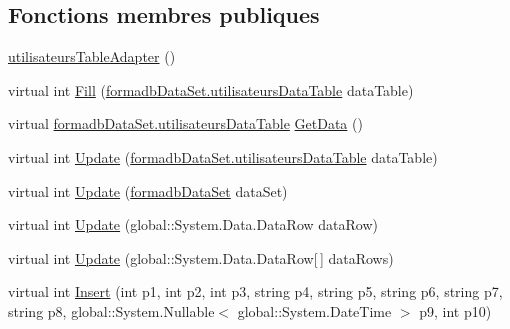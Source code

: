 \subsection*{Fonctions membres publiques}
\begin{DoxyCompactItemize}
\item 
\hyperlink{classforma_1_1formadb_data_set_table_adapters_1_1utilisateurs_table_adapter_aa3e62a7d0672b2e2de3e43ef5962ad52}{utilisateurs\+Table\+Adapter} ()
\item 
virtual int \hyperlink{classforma_1_1formadb_data_set_table_adapters_1_1utilisateurs_table_adapter_a84a57c5fdff4bf02ef608b338e19df12}{Fill} (\hyperlink{classforma_1_1formadb_data_set_1_1utilisateurs_data_table}{formadb\+Data\+Set.\+utilisateurs\+Data\+Table} data\+Table)
\item 
virtual \hyperlink{classforma_1_1formadb_data_set_1_1utilisateurs_data_table}{formadb\+Data\+Set.\+utilisateurs\+Data\+Table} \hyperlink{classforma_1_1formadb_data_set_table_adapters_1_1utilisateurs_table_adapter_acbeeb92369790ff85945b79554afbf77}{Get\+Data} ()
\item 
virtual int \hyperlink{classforma_1_1formadb_data_set_table_adapters_1_1utilisateurs_table_adapter_a3b8268d9c4eba101c27c9716e8c0e408}{Update} (\hyperlink{classforma_1_1formadb_data_set_1_1utilisateurs_data_table}{formadb\+Data\+Set.\+utilisateurs\+Data\+Table} data\+Table)
\item 
virtual int \hyperlink{classforma_1_1formadb_data_set_table_adapters_1_1utilisateurs_table_adapter_a6f61d7aecd388d2dc43d8f38a875469e}{Update} (\hyperlink{classforma_1_1formadb_data_set}{formadb\+Data\+Set} data\+Set)
\item 
virtual int \hyperlink{classforma_1_1formadb_data_set_table_adapters_1_1utilisateurs_table_adapter_aba485b7f40ccbb265728c4be7be477c2}{Update} (global\+::\+System.\+Data.\+Data\+Row data\+Row)
\item 
virtual int \hyperlink{classforma_1_1formadb_data_set_table_adapters_1_1utilisateurs_table_adapter_acc3a635d72bab45e52e6d0d38700b425}{Update} (global\+::\+System.\+Data.\+Data\+Row\mbox{[}$\,$\mbox{]} data\+Rows)
\item 
virtual int \hyperlink{classforma_1_1formadb_data_set_table_adapters_1_1utilisateurs_table_adapter_a5eb877bc2d51ed01bcf50ff4182d9592}{Insert} (int p1, int p2, int p3, string p4, string p5, string p6, string p7, string p8, global\+::\+System.\+Nullable$<$ global\+::\+System.\+Date\+Time $>$ p9, int p10)
\end{DoxyCompactItemize}
